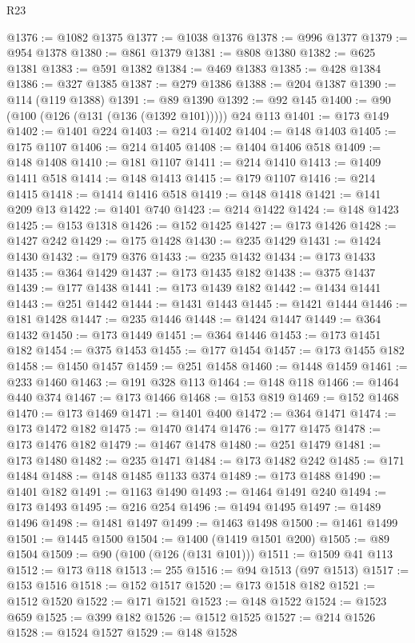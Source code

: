 \begin{lexlean}{R23}
\begin{coremodule}
@1376 := @1082 @1375
@1377 := @1038 @1376
@1378 := @996 @1377
@1379 := @954 @1378
@1380 := @861 @1379
@1381 := @808 @1380
@1382 := @625 @1381
@1383 := @591 @1382
@1384 := @469 @1383
@1385 := @428 @1384
@1386 := @327 @1385
@1387 := @279 @1386
@1388 := @204 @1387
@1390 := @114 (@119 @1388)
@1391 := @89 @1390
@1392 := @92 @145
@1400 := @90 (@100 (@126 (@131 (@136 (@1392 @101))))) @24 @113
@1401 := @173 @149
@1402 := @1401 @224
@1403 := @214 @1402
@1404 := @148 @1403
@1405 := @175 @1107
@1406 := @214 @1405
@1408 := @1404 @1406 @518
@1409 := @148 @1408
@1410 := @181 @1107
@1411 := @214 @1410
@1413 := @1409 @1411 @518
@1414 := @148 @1413
@1415 := @179 @1107
@1416 := @214 @1415
@1418 := @1414 @1416 @518
@1419 := @148 @1418
@1421 := @141 @209 @13
@1422 := @1401 @740
@1423 := @214 @1422
@1424 := @148 @1423
@1425 := @153 @1318
@1426 := @152 @1425
@1427 := @173 @1426
@1428 := @1427 @242
@1429 := @175 @1428
@1430 := @235 @1429
@1431 := @1424 @1430
@1432 := @179 @376
@1433 := @235 @1432
@1434 := @173 @1433
@1435 := @364 @1429
@1437 := @173 @1435 @182
@1438 := @375 @1437
@1439 := @177 @1438
@1441 := @173 @1439 @182
@1442 := @1434 @1441
@1443 := @251 @1442
@1444 := @1431 @1443
@1445 := @1421 @1444
@1446 := @181 @1428
@1447 := @235 @1446
@1448 := @1424 @1447
@1449 := @364 @1432
@1450 := @173 @1449
@1451 := @364 @1446
@1453 := @173 @1451 @182
@1454 := @375 @1453
@1455 := @177 @1454
@1457 := @173 @1455 @182
@1458 := @1450 @1457
@1459 := @251 @1458
@1460 := @1448 @1459
@1461 := @233 @1460
@1463 := @191 @328 @113
@1464 := @148 @118
@1466 := @1464 @440 @374
@1467 := @173 @1466
@1468 := @153 @819
@1469 := @152 @1468
@1470 := @173 @1469
@1471 := @1401 @400
@1472 := @364 @1471
@1474 := @173 @1472 @182
@1475 := @1470 @1474
@1476 := @177 @1475
@1478 := @173 @1476 @182
@1479 := @1467 @1478
@1480 := @251 @1479
@1481 := @173 @1480
@1482 := @235 @1471
@1484 := @173 @1482 @242
@1485 := @171 @1484
@1488 := @148 @1485 @1133 @374
@1489 := @173 @1488
@1490 := @1401 @182
@1491 := @1163 @1490
@1493 := @1464 @1491 @240
@1494 := @173 @1493
@1495 := @216 @254
@1496 := @1494 @1495
@1497 := @1489 @1496
@1498 := @1481 @1497
@1499 := @1463 @1498
@1500 := @1461 @1499
@1501 := @1445 @1500
@1504 := @1400 (@1419 @1501 @200)
@1505 := @89 @1504
@1509 := @90 (@100 (@126 (@131 @101)))
@1511 := @1509 @41 @113
@1512 := @173 @118
@1513 := 255
@1516 := @94 @1513 (@97 @1513)
@1517 := @153 @1516
@1518 := @152 @1517
@1520 := @173 @1518 @182
@1521 := @1512 @1520
@1522 := @171 @1521
@1523 := @148 @1522
@1524 := @1523 @659
@1525 := @399 @182
@1526 := @1512 @1525
@1527 := @214 @1526
@1528 := @1524 @1527
@1529 := @148 @1528

\end{coremodule}
\end{lexlean}
